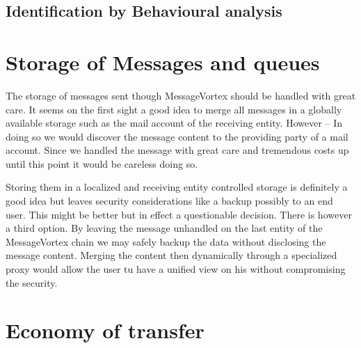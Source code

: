 
\subsection{Identification by Behavioural analysis}


\section{Storage of Messages and queues}
The storage of messages sent though MessageVortex should be handled with great care. It seems on the first sight a good idea to merge all messages in a globally available storage such as the mail account of the receiving entity. However -- In doing so we would discover the message content to the providing party of a mail account. Since we handled the message with great care and tremendous costs up until this point it would be careless doing so. 

Storing them in a localized and receiving entity controlled storage is definitely a good idea but leaves security considerations like a backup possibly to an end user. This might be better but in effect a questionable decision. There is however a third option. By leaving the message unhandled on the last entity of the MessageVortex chain we may safely backup the data without disclosing the message content. Merging the content then dynamically through a specialized proxy would allow the user tu have a unified view on his without compromising the security.


\section{Economy of transfer}

